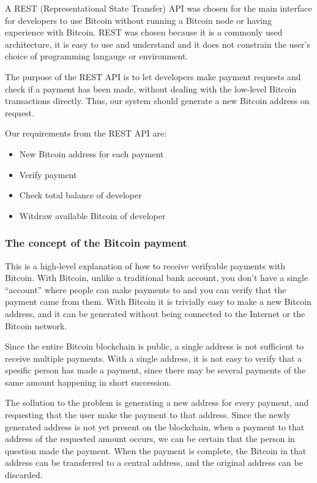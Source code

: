 A REST (Representational State Transfer) API \cite{Oracle.com} was chosen for the main interface for developers to use Bitcoin without running a Bitcoin node or having experience with Bitcoin. REST was chosen because it is a commonly used architecture, it is easy to use and understand and it does not constrain the user's choice of programming langauge or environment. 

The purpose of the REST API is to let developers make payment requests and check if a payment has been made, without dealing with the low-level Bitcoin transactions directly. Thus, our system should generate a new Bitcoin address on request. 

Our requirements from the REST API are:

\begin{itemize}
	\item New Bitcoin address for each payment
	\item Verify payment
	\item Check total balance of developer
	\item Witdraw available Bitcoin of developer
\end{itemize}

\subsubsection{The concept of the Bitcoin payment}

This is a high-level explanation of how to receive verifyable payments with Bitcoin. With Bitcoin, unlike a traditional bank account, you don't have a single ``account'' where people can make payments to and you can verify that the payment came from them. With Bitcoin it is trivially easy to make a new Bitcoin address, and it can be generated without being connected to the Internet or the Bitcoin network.

Since the entire Bitcoin blockchain is public, a single address is not sufficient to receive multiple payments. With a single address, it is not easy to verify that a spesific person has made a payment, since there may be several payments of the same amount happening in short succession.

The sollution to the problem is generating a new address for every payment, and requesting that the user make the payment to that address. Since the newly generated address is not yet present on the blockchain, when a payment to that address of the requested amount occurs, we can be certain that the person in question made the payment. When the payment is complete, the Bitcoin in that address can be transferred to a central address, and the original address can be discarded.

